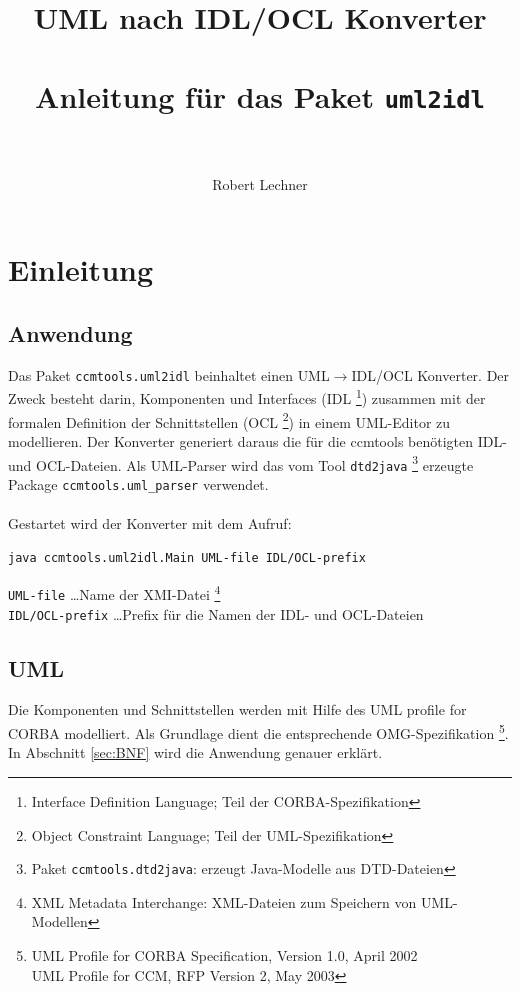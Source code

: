 \documentclass [a4paper,10pt] {scrartcl}
\author{Robert Lechner}
\title{
UML nach IDL/OCL Konverter\\
{\LARGE ~\\ Anleitung f{\"u}r das Paket \texttt{uml2idl}}\\
~
}
\begin{document}
\maketitle
\tableofcontents
\cleardoublepage

\section{Einleitung}
\subsection{Anwendung}
Das Paket \texttt{ccmtools.uml2idl} beinhaltet einen \textsf{UML}$\rightarrow$\textsf{IDL/OCL}
Konverter. Der Zweck besteht darin, Komponenten und Interfaces (\textsf{IDL}
\footnote{Interface Definition Language; Teil der CORBA-Spezifikation}) zusammen mit der
formalen Definition der Schnittstellen (\textsf{OCL}
\footnote{Object Constraint Language; Teil der UML-Spezifikation}) in einem \textsf{UML}-Editor
zu modellieren. Der Konverter generiert daraus die f{\"u}r die \textsf{ccmtools} ben{\"o}tigten
\textsf{IDL}- und \textsf{OCL}-Dateien.
Als \textsf{UML}-Parser wird das vom Tool \texttt{dtd2java}
\footnote{Paket \texttt{ccmtools.dtd2java}: erzeugt Java-Modelle aus DTD-Dateien}
erzeugte Package \texttt{ccmtools.uml\_parser} verwendet. \\
~\\
Gestartet wird der Konverter mit dem Aufruf:
\begin{verbatim}
java ccmtools.uml2idl.Main UML-file IDL/OCL-prefix
\end{verbatim}
\texttt{UML-file} \dots Name der \textsf{XMI}-Datei
\footnote{XML Metadata Interchange: XML-Dateien zum Speichern von UML-Modellen}\\
\texttt{IDL/OCL-prefix} \dots Prefix f{\"u}r die Namen der \textsf{IDL}- und \textsf{OCL}-Dateien
\subsection{UML}
Die Komponenten und Schnittstellen werden mit Hilfe des \textsf{UML profile for CORBA}
modelliert. Als Grundlage dient die entsprechende \textsf{OMG}-Spezifikation
\footnote{UML Profile for CORBA Specification, Version 1.0, April 2002\\
UML Profile for CCM, RFP Version 2, May 2003}.\\
In Abschnitt \ref{sec:BNF} wird die Anwendung genauer erkl{\"a}rt.
\end{document}
